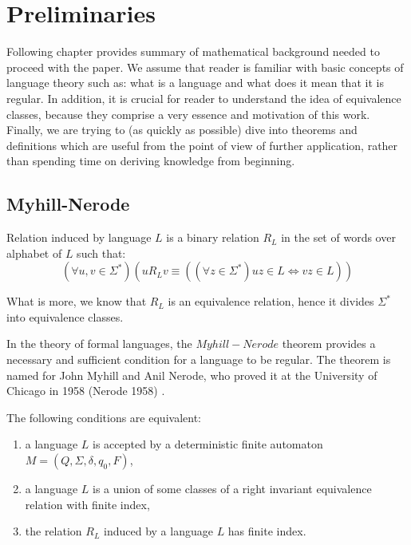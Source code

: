 \documentclass{mini}
\begin{document}
\chapter{Preliminaries}\label{chap:prelim}
Following chapter provides summary of mathematical background needed to proceed with the paper. We assume that reader is familiar with basic concepts of language theory such as: what is a language and what does it mean that it is regular. In addition, it is crucial for reader to understand the idea of equivalence classes, because they comprise a very essence and motivation of this work. Finally, we are trying to (as quickly as possible) dive into theorems and definitions which are useful from the point of view of further application, rather than spending time on deriving knowledge from beginning.
\section{Myhill-Nerode}
\begin{definition} \label{def:myhill}
    Relation induced by language $L$ is a binary relation $R_{L}$ in the set of words over alphabet of $L$ such that:
    \[
    (\forall{u,v \in \Sigma^{*}})(u R_{L} v \equiv ((\forall z \in \Sigma^{*}) uz \in L \Leftrightarrow vz \in L))
    \]
\end{definition}
What is more, we know that $R_{L}$ is an equivalence relation, hence it divides $\Sigma^{*}$ into equivalence classes.

In the theory of formal languages, the $Myhill-Nerode$ theorem provides a necessary and sufficient condition for a language to be regular. The theorem is named for John Myhill and Anil Nerode, who proved it at the University of Chicago in 1958 (Nerode 1958) \cite{Myhill_Nerode}.

\begin{theorem}\label{Theorem:Myhill_Nerode}
    The following conditions are equivalent:
    \begin{enumerate}
        \item a language $L$ is accepted by a deterministic finite automaton $M = (Q,\Sigma,\delta,q_0,F)$,
        \item a language $L$ is a union of some classes of a right invariant equivalence relation with finite index,
        \item the relation $R_{L}$ induced by a language $L$ has finite index.
    \end{enumerate}
\end{theorem}
\end{document}
